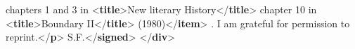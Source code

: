 \begin{shaded}
\hspace*{1em}\hspace*{1em}chapters 1 and 3 in {<\textbf{title}>}New literary History{</\textbf{title}>}\mbox{}\newline 
\hspace*{1em}\hspace*{1em}\mbox{}\newline 
\hspace*{1em}\hspace*{1em}chapter 10 in {<\textbf{title}>}Boundary II{</\textbf{title}>} (1980){</\textbf{item}>}\mbox{}\newline 
\hspace*{1em}.\mbox{}\newline 
\hspace*{1em}\hspace*{1em} I am grateful for permission to reprint.{</\textbf{p}>}\mbox{}\newline 
{}S.F.{</\textbf{signed}>}\mbox{}\newline 
{</\textbf{div}>}\end{shaded}\egroup\par \par
